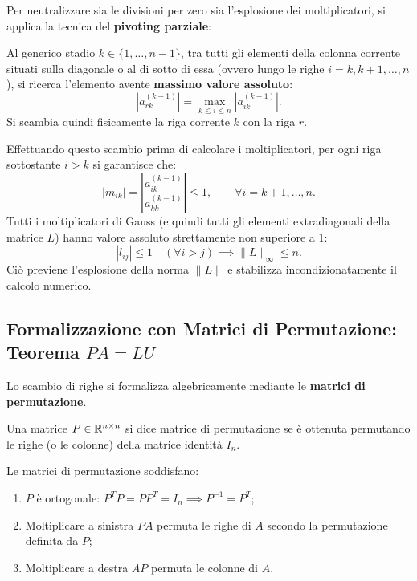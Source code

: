 Per neutralizzare sia le divisioni per zero sia l'esplosione dei moltiplicatori, si applica la tecnica del \textbf{pivoting parziale}:
\begin{definition}
Al generico stadio $k \in \{1, \dots, n-1\}$, tra tutti gli elementi della colonna corrente situati sulla diagonale o al di sotto di essa (ovvero lungo le righe $i = k, k+1, \dots, n$), si ricerca l'elemento avente \textbf{massimo valore assoluto}:
\begin{equation}
    |a_{rk}^{(k-1)}| = \max_{k \le i \le n} |a_{ik}^{(k-1)}|.
    \label{eq:regola-pivoting-parziale}
\end{equation}
Si scambia quindi fisicamente la riga corrente $k$ con la riga $r$.
\end{definition}

Effettuando questo scambio prima di calcolare i moltiplicatori, per ogni riga sottostante $i > k$ si garantisce che:
\begin{equation}
    |m_{ik}| = \left| \frac{a_{ik}^{(k-1)}}{a_{kk}^{(k-1)}} \right| \le 1, \qquad \forall i = k+1, \dots, n.
\end{equation}
Tutti i moltiplicatori di Gauss (e quindi tutti gli elementi extradiagonali della matrice $L$) hanno valore assoluto strettamente non superiore a 1:
\begin{equation}
    |l_{ij}| \le 1 \quad (\forall i > j) \implies \|L\|_{\infty} \le n.
\end{equation}
Ci\`o previene l'esplosione della norma $\|L\|$ e stabilizza incondizionatamente il calcolo numerico.

\subsection{Formalizzazione con Matrici di Permutazione: Teorema $PA = LU$}
Lo scambio di righe si formalizza algebricamente mediante le \textbf{matrici di permutazione}.

\begin{definition}
Una matrice $P \in \mathbb{R}^{n \times n}$ si dice matrice di permutazione se \`e ottenuta permutando le righe (o le colonne) della matrice identit\`a $I_n$.
\end{definition}

\begin{property}
Le matrici di permutazione soddisfano:
\begin{enumerate}
    \item $P$ \`e ortogonale: $P^T P = P P^T = I_n \implies P^{-1} = P^T$;
    \item Moltiplicare a sinistra $PA$ permuta le righe di $A$ secondo la permutazione definita da $P$;
    \item Moltiplicare a destra $AP$ permuta le colonne di $A$.
\end{enumerate}
\end{property}

